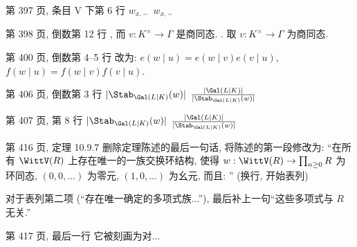 \documentclass{AJerrata}
\begin{document}
\begin{Errata}

        \item[第 397 页, 条目 V 下第 6 行]
        \Orig $w_{x.-}$
        \Corr $w_{x,-}$

        \item[第 398 页, 倒数第 12 行]
        \Orig \; , 而 $v: K^\times \to \Gamma$ 是商同态.
        \Corr \; . 取 $v: K^\times \to \Gamma$ 为商同态.
        
        \item[第 400 页, 倒数第 4--5 行]
		改为: $e(w \mid u) = e(w \mid v) e(v \mid u)$, $f(w \mid u) = f(w \mid v) f(v \mid u)$.

		\item[第 406 页, 倒数第 3 行]
		\Orig $|\Stab_{\Gal(L|K)}(w)|$
		\Corr $\frac{|\Gal(L|K)|}{|\Stab_{\Gal(L|K)}(w)|}$
		
		\item[第 407 页, 第 8 行]
		\Orig $|\Stab_{\Gal(L|K)}(w)|$
		\Corr $\frac{|\Gal(L|K)|}{|\Stab_{\Gal(L|K)}(w)|}$

        \item[第 416 页, 定理 10.9.7]
        删除定理陈述的最后一句话, 将陈述的第一段修改为: ``在所有 $\WittV(R)$ 上存在唯一的一族交换环结构, 使得 $w: \WittV(R) \to \prod_{n \geq 0} R$ 为环同态, $(0, 0, \ldots)$ 为零元, $(1, 0, \ldots)$ 为幺元, 而且: '' (换行, 开始表列)
        
        对于表列第二项 (``存在唯一确定的多项式族...''), 最后补上一句``这些多项式与 $R$ 无关.''

        \item[第 417 页, 最后一行] 它被刻画为对...
	\end{Errata}
\end{document}

